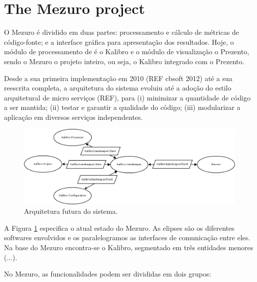 \documentclass{llncs}
\begin{document}
\section{The Mezuro project}
\label{sec:mezuro}

O Mezuro é dividido em duas partes: processamento e cálculo de métricas de
código-fonte; e a interface gráfica para apresentação dos resultados. Hoje, o
módulo de processamento de é o Kalibro e o módulo de visualização o Prezento,
sendo o Mezuro o projeto inteiro, ou seja, o Kalibro integrado com o Prezento.

Desde a sua primeira implementação em 2010 (REF cbsoft 2012) até a sua
reescrita completa, a arquitetura do sistema evoluiu até a adoção do estilo
arquitetural de micro serviços (REF), para  (i) minimizar a quantidade de
código a ser mantida; (ii) testar e garantir a qualidade do código; (iii)
modularizar a aplicação em diversos serviços independentes.

\begin{figure}[H]
  \centering
    \includegraphics[width=\textwidth]{images/mezuro-architecture-predicted.png}
  \caption{Arquitetura futura do sistema.}
  \label{fig:architecture-2}
\end{figure}


A Figura \ref{fig:architecture-2} especifica o atual estado do Mezuro. As
elipses são os diferentes softwares envolvidos e os paralelogramos as
interfaces de comunicação entre eles. Na base do Mezuro encontra-se o Kalibro,
segmentado em três entidades menores (...).

No Mezuro, as funcionalidades podem ser divididas em dois grupos:
\end{document}
